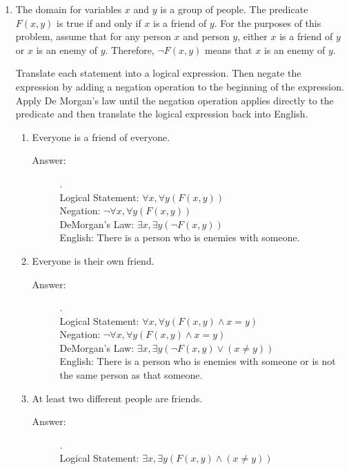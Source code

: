\documentclass[12pt, oneside]{article}
\begin{document}
\begin{enumerate}
\item The domain for variables $x$ and $y$ is a group of people. The predicate $F(x, y)$ is true if and only if $x$ is a friend of $y$. For the purposes of this problem, assume that for any person $x$ and person $y$, either $x$ is a friend of $y$ or $x$ is an enemy of $y$. Therefore, $\neg F(x, y)$ means that $x$ is an enemy of $y$.

Translate each statement into a logical expression. Then negate the expression by adding a negation operation to the beginning of the expression. Apply De Morgan's law until the negation operation applies directly to the predicate and then translate the logical expression back into English.

\begin{enumerate}
    \item Everyone is a friend of everyone.
    \begin{description}
        \item[Answer:] .\\
        Logical Statement: $\forall x, \forall y(F(x,y))$\\
        Negation: $\lnot \forall x, \forall y(F(x,y))$\\
        DeMorgan's Law: $\exists x, \exists y(\lnot F(x,y))$\\
        English: There is a person who is enemies with someone.
    \end{description}
    \item Everyone is their own friend.
    \begin{description}
        \item[Answer:] .\\
        Logical Statement: $\forall x, \forall y(F(x,y) \land x=y)$\\
        Negation: $\lnot \forall x, \forall y(F(x,y) \land x=y)$\\
        DeMorgan's Law: $\exists x, \exists y(\lnot F(x,y) \lor (x \neq y))$\\
        English: There is a person who is enemies with someone or is not the same person as that someone.
    \end{description}
    \item At least two different people are friends.
    \begin{description}
        \item[Answer:] .\\
        Logical Statement: $\exists x, \exists y (F(x,y) \land (x \neq y))$\\

\end{description}
\end{enumerate}
\end{enumerate}
\end{document}
